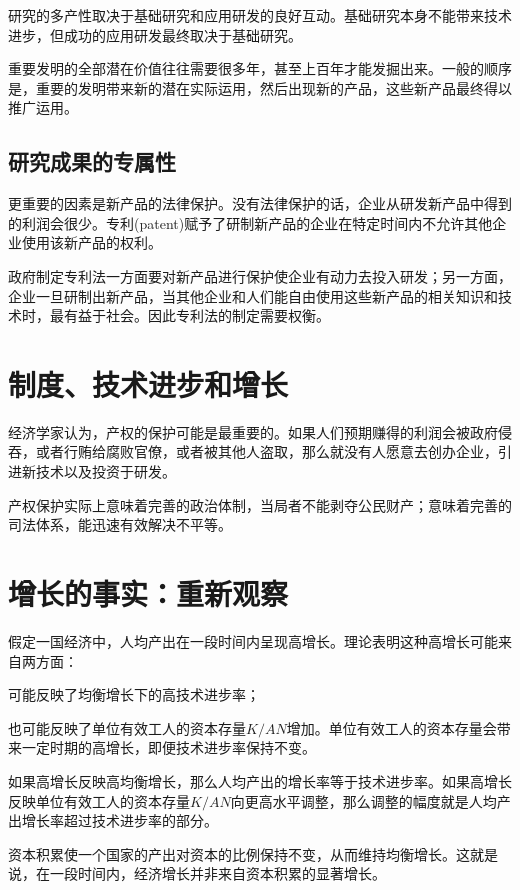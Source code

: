 \documentclass{article}
\begin{document}
研究的多产性取决于基础研究和应用研发的良好互动。基础研究本身不能带来技术进步，但成功的应用研发最终取决于基础研究。

重要发明的全部潜在价值往往需要很多年，甚至上百年才能发掘出来。一般的顺序是，重要的发明带来新的潜在实际运用，然后出现新的产品，这些新产品最终得以推广运用。

\subsection{研究成果的专属性}

更重要的因素是新产品的法律保护。没有法律保护的话，企业从研发新产品中得到的利润会很少。专利(patent)赋予了研制新产品的企业在特定时间内不允许其他企业使用该新产品的权利。

政府制定专利法一方面要对新产品进行保护使企业有动力去投入研发；另一方面，企业一旦研制出新产品，当其他企业和人们能自由使用这些新产品的相关知识和技术时，最有益于社会。因此专利法的制定需要权衡。

\section{制度、技术进步和增长}

经济学家认为，产权的保护可能是最重要的。如果人们预期赚得的利润会被政府侵吞，或者行贿给腐败官僚，或者被其他人盗取，那么就没有人愿意去创办企业，引进新技术以及投资于研发。

产权保护实际上意味着完善的政治体制，当局者不能剥夺公民财产；意味着完善的司法体系，能迅速有效解决不平等。


\section{增长的事实：重新观察}

假定一国经济中，人均产出在一段时间内呈现高增长。理论表明这种高增长可能来自两方面：

可能反映了均衡增长下的高技术进步率；

也可能反映了单位有效工人的资本存量$ K/AN $增加。单位有效工人的资本存量会带来一定时期的高增长，即便技术进步率保持不变。

如果高增长反映高均衡增长，那么人均产出的增长率等于技术进步率。如果高增长反映单位有效工人的资本存量$ K/AN $向更高水平调整，那么调整的幅度就是人均产出增长率超过技术进步率的部分。

资本积累使一个国家的产出对资本的比例保持不变，从而维持均衡增长。这就是说，在一段时间内，经济增长并非来自资本积累的显著增长。
\end{document}
